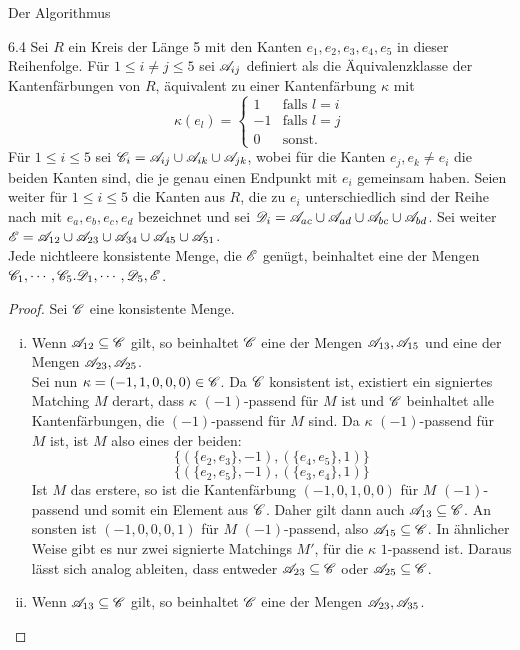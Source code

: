 \begin{section}{Der Algorithmus}
 \begin{lemmal}{ }{6.4}
  Sei $R$ ein Kreis der Länge 5 mit den Kanten $e_1,e_2,e_3,e_4,e_5$ in dieser Reihenfolge. Für $1 \leq i \neq j \leq 5$ sei $\mathscr{A}_{ij}$ definiert als die Äquivalenzklasse der Kantenfärbungen von $R$, äquivalent zu einer Kantenfärbung $\kappa$ mit 
  \[\kappa(e_l) = \begin{cases}
    1 &\text{falls } l = i\\
    -1 &\text{falls } l = j\\
    0 &\text{sonst.}
   \end{cases}\]
  Für $1 \leq i \leq 5$ sei $\mathscr{C}_i = \mathscr{A}_{ij}\cup\mathscr{A}_{ik}\cup\mathscr{A}_{jk}$, wobei für die Kanten $e_j,e_k \neq e_i$ die beiden Kanten sind, die je genau einen Endpunkt mit $e_i$ gemeinsam haben. Seien weiter für $1\leq i \leq 5$ die Kanten aus $R$, die zu $e_i$ unterschiedlich sind der Reihe nach mit $e_a,e_b,e_c,e_d$ bezeichnet und sei  $\mathscr{D}_i = \mathscr{A}_{ac}\cup\mathscr{A}_{ad}\cup\mathscr{A}_{bc}\cup\mathscr{A}_{bd}$. Sei weiter $\mathscr{E} = \mathscr{A}_{12}\cup\mathscr{A}_{23}\cup\mathscr{A}_{34}\cup\mathscr{A}_{45}\cup\mathscr{A}_{51}$.\\
  Jede nichtleere konsistente Menge, die $\mathscr{E}$ genügt, beinhaltet eine der Mengen $\mathscr{C}_1,\cdots,\mathscr{C}_5.\mathscr{D}_1,\cdots,\mathscr{D}_5,\mathscr{E}$.
 \end{lemmal}
 \begin{proof}
  Sei $\mathscr{C}$ eine konsistente Menge.
  \begin{enumerate}[(i)]
   \item Wenn $\mathscr{A}_{12} \subseteq \mathscr{C}$ gilt, so beinhaltet $\mathscr{C}$ eine der Mengen $\mathscr{A}_{13},\mathscr{A}_{15}$ und eine der Mengen $\mathscr{A}_{23},\mathscr{A}_{25}$.\\
   Sei nun $\kappa = (-1,1,0,0,0) \in \mathscr{C}$. Da $\mathscr{C}$ konsistent ist, existiert ein signiertes Matching $M$ derart, dass $\kappa$ $(-1)$-passend für $M$ ist und $\mathscr{C}$ beinhaltet alle Kantenfärbungen, die $(-1)$-passend für $M$ sind. Da $\kappa$ $(-1)$-passend für $M$ ist, ist $M$ also eines der beiden:
   \[\{(\{e_2,e_3\},-1),(\{e_4,e_5\},1)\}\]
   \[\{(\{e_2,e_5\},-1),(\{e_3,e_4\},1)\}\]
   Ist $M$ das erstere, so ist die Kantenfärbung $(-1,0,1,0,0)$ für $M$ $(-1)$-passend und somit ein Element aus $\mathscr{C}$. Daher gilt dann auch $\mathscr{A}_{13}\subseteq\mathscr{C}$. An sonsten ist $(-1,0,0,0,1)$ für $M$ $(-1)$-passend, also $\mathscr{A}_{15}\subseteq\mathscr{C}$. In ähnlicher Weise gibt es nur zwei signierte Matchings $M'$, für die $\kappa$ $1$-passend ist. Daraus lässt sich analog ableiten, dass entweder $\mathscr{A}_{23}\subseteq\mathscr{C}$ oder $\mathscr{A}_{25}\subseteq\mathscr{C}$.
   \item Wenn $\mathscr{A}_{13} \subseteq \mathscr{C}$ gilt, so beinhaltet $\mathscr{C}$ eine der Mengen $\mathscr{A}_{23},\mathscr{A}_{35}$.\\

\end{enumerate}
\end{proof}
\end{section}
